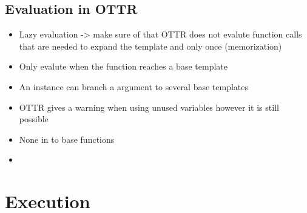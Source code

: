 \subsection{Evaluation in OTTR}
\begin{itemize}
    \item Lazy evaluation -> make sure of that OTTR does not evalute function calls that are needed to expand the template and only once (memorization)
    \item Only evalute when the function reaches a base template
    \item An instance can branch a argument to several base templates 
    \item OTTR gives a warning when using unused variables however it is still possible
    \item None in to base functions 
    \item 
\end{itemize}


\section{Execution}



